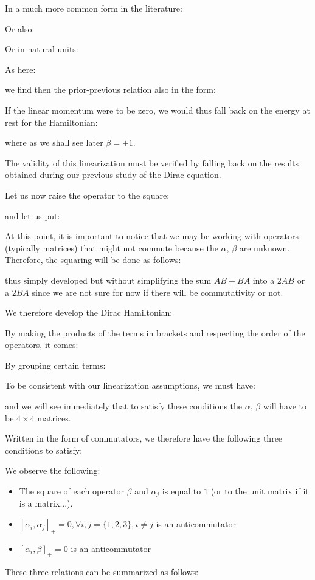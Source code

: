 	In a much more common form in the literature:
	
	Or also:
	
	Or in natural units:
	
	As here:
	
	we find then the prior-previous relation also in the form:
	
	If the linear momentum were to be zero, we would thus fall back on the energy at rest for the Hamiltonian:
	
	where as we shall see later $\beta=\pm 1$.
	
	The validity of this linearization must be verified by falling back on the results obtained during our previous study of the Dirac equation.

	Let us now raise the operator to the square:
	
	and let us put:
	
	At this point, it is important to notice that we may be working with operators (typically matrices) that might not commute because the $\alpha$, $\beta$ are unknown. Therefore, the squaring will be done as follows:
	
	thus simply developed but without simplifying the sum $AB + BA$ into a $2AB$ or a $2BA$ since we are not sure for now if there will be commutativity or not.

	We therefore develop the Dirac Hamiltonian:
	
	By making the products of the terms in brackets and respecting the order of the operators, it comes:
	
	By grouping certain terms:
	
	To be consistent with our linearization assumptions, we must have:
	
	and we will see immediately that to satisfy these conditions the $\alpha$, $\beta$ will have to be $4\times 4$ matrices.

	Written in the form of commutators, we therefore have the following three conditions to satisfy:
	
	We observe the following:
	\begin{itemize}
		\item The square of each operator $\beta$ and $\alpha_j$ is equal to $1$ (or to the unit matrix if it is a matrix...).

		\item $\left[\alpha_i,\alpha_j\right]_{+}=0,\forall i,j=\{1,2,3\},i\neq j$ is an anticommutator

		\item $\left[\alpha_i,\beta\right]_{+}=0$ is an anticommutator
	\end{itemize}
	These three relations can be summarized as follows:
	

